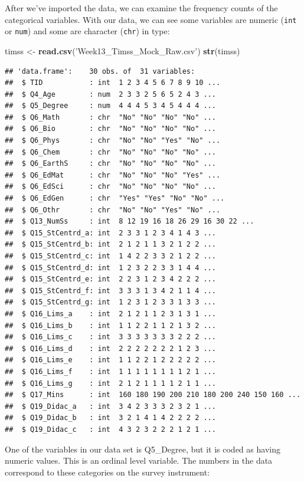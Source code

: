 \documentclass[
]{article}
\newenvironment{Shaded}{\begin{snugshade}}{\end{snugshade}}
\newcommand{\KeywordTok}[1]{\textcolor[rgb]{0.13,0.29,0.53}{\textbf{#1}}}
\newcommand{\NormalTok}[1]{#1}
\newcommand{\StringTok}[1]{\textcolor[rgb]{0.31,0.60,0.02}{#1}}
\begin{document}
After we've imported the data, we can examine the frequency counts of the categorical variables. With our data, we can see some variables are numeric (\texttt{int} or \texttt{num}) and some are character (\texttt{chr}) in type:

\begin{Shaded}
\begin{Highlighting}[]
\NormalTok{timss <-}\StringTok{ }\KeywordTok{read.csv}\NormalTok{(}\StringTok{'Week13_Timss_Mock_Raw.csv'}\NormalTok{) }
\KeywordTok{str}\NormalTok{(timss)}
\end{Highlighting}
\end{Shaded}

\begin{verbatim}
## 'data.frame':    30 obs. of  31 variables:
##  $ TID           : int  1 2 3 4 5 6 7 8 9 10 ...
##  $ Q4_Age        : num  2 3 3 2 5 6 5 2 4 3 ...
##  $ Q5_Degree     : num  4 4 4 5 3 4 5 4 4 4 ...
##  $ Q6_Math       : chr  "No" "No" "No" "No" ...
##  $ Q6_Bio        : chr  "No" "No" "No" "No" ...
##  $ Q6_Phys       : chr  "No" "No" "Yes" "No" ...
##  $ Q6_Chem       : chr  "No" "No" "No" "No" ...
##  $ Q6_EarthS     : chr  "No" "No" "No" "No" ...
##  $ Q6_EdMat      : chr  "No" "No" "No" "Yes" ...
##  $ Q6_EdSci      : chr  "No" "No" "No" "No" ...
##  $ Q6_EdGen      : chr  "Yes" "Yes" "No" "No" ...
##  $ Q6_Othr       : chr  "No" "No" "Yes" "No" ...
##  $ Q13_NumSs     : int  8 12 19 16 18 26 29 16 30 22 ...
##  $ Q15_StCentrd_a: int  2 3 3 1 2 3 4 1 4 3 ...
##  $ Q15_StCentrd_b: int  2 1 2 1 1 3 2 1 2 2 ...
##  $ Q15_StCentrd_c: int  1 4 2 2 3 3 2 1 2 2 ...
##  $ Q15_StCentrd_d: int  1 2 3 2 2 3 3 1 4 4 ...
##  $ Q15_StCentrd_e: int  2 2 3 1 2 3 4 2 2 2 ...
##  $ Q15_StCentrd_f: int  3 3 3 1 3 4 2 1 1 4 ...
##  $ Q15_StCentrd_g: int  1 2 3 1 2 3 3 1 3 3 ...
##  $ Q16_Lims_a    : int  2 1 2 1 1 2 3 1 3 1 ...
##  $ Q16_Lims_b    : int  1 1 2 2 1 1 2 1 3 2 ...
##  $ Q16_Lims_c    : int  3 3 3 3 3 3 3 2 2 2 ...
##  $ Q16_Lims_d    : int  2 2 2 2 2 2 2 1 2 3 ...
##  $ Q16_Lims_e    : int  1 1 2 2 1 2 2 2 2 2 ...
##  $ Q16_Lims_f    : int  1 1 1 1 1 1 1 1 2 1 ...
##  $ Q16_Lims_g    : int  2 1 2 1 1 1 1 2 1 1 ...
##  $ Q17_Mins      : int  160 180 190 200 210 180 200 240 150 160 ...
##  $ Q19_Didac_a   : int  3 4 2 3 3 3 2 3 2 1 ...
##  $ Q19_Didac_b   : int  3 2 1 4 1 4 2 2 2 2 ...
##  $ Q19_Didac_c   : int  4 3 2 3 2 2 2 1 2 1 ...
\end{verbatim}

One of the variables in our data set is Q5\_Degree, but it is coded as having numeric values. This is an ordinal level variable. The numbers in the data correspond to these categories on the survey instrument:
\end{document}
